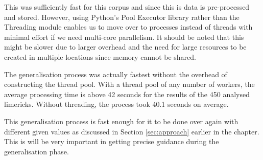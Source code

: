 This was sufficiently fast for this corpus and since this is data is pre-processed and stored. However, using Python's Pool Executor library rather than the Threading module enables us to move over to processes instead of threads with minimal effort if we need multi-core parallelism. It should be noted that this might be slower due to larger overhead and the need for large resources to be created in multiple locations since memory cannot be shared.

The generalisation process was actually fastest without the overhead of constructing the thread pool. With a thread pool of any number of workers, the average processing time is above 42 seconds for the results of the 450 analysed limericks. Without threading, the process took 40.1 seconds on average.

This generalisation process is fast enough for it to be done over again with different given values as discussed in Section \ref{sec:approach} earlier in the chapter. This is will be very important in getting precise guidance during the generalisation phase.



